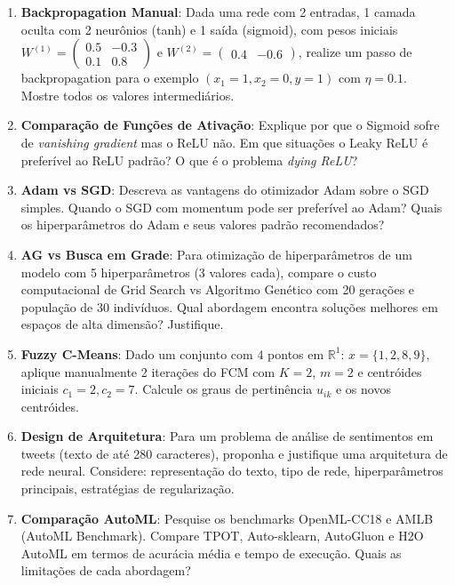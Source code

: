 \documentclass[12pt,a4paper]{article}
\begin{document}
\begin{enumerate}
  \item \textbf{Backpropagation Manual}: Dada uma rede com 2 entradas, 1 camada oculta com 2 neurônios (tanh) e 1 saída (sigmoid), com pesos iniciais $W^{(1)} = \begin{pmatrix}0.5 & -0.3\\ 0.1 & 0.8\end{pmatrix}$ e $W^{(2)} = \begin{pmatrix}0.4 & -0.6\end{pmatrix}$, realize um passo de backpropagation para o exemplo $(x_1=1, x_2=0, y=1)$ com $\eta=0.1$. Mostre todos os valores intermediários.

  \item \textbf{Comparação de Funções de Ativação}: Explique por que o Sigmoid sofre de \textit{vanishing gradient} mas o ReLU não. Em que situações o Leaky ReLU é preferível ao ReLU padrão? O que é o problema \textit{dying ReLU}?

  \item \textbf{Adam vs SGD}: Descreva as vantagens do otimizador Adam sobre o SGD simples. Quando o SGD com momentum pode ser preferível ao Adam? Quais os hiperparâmetros do Adam e seus valores padrão recomendados?

  \item \textbf{AG vs Busca em Grade}: Para otimização de hiperparâmetros de um modelo com 5 hiperparâmetros (3 valores cada), compare o custo computacional de Grid Search vs Algoritmo Genético com 20 gerações e população de 30 indivíduos. Qual abordagem encontra soluções melhores em espaços de alta dimensão? Justifique.

  \item \textbf{Fuzzy C-Means}: Dado um conjunto com 4 pontos em $\mathbb{R}^1$: $x = \{1, 2, 8, 9\}$, aplique manualmente 2 iterações do FCM com $K=2$, $m=2$ e centróides iniciais $c_1=2, c_2=7$. Calcule os graus de pertinência $u_{ik}$ e os novos centróides.

  \item \textbf{Design de Arquitetura}: Para um problema de análise de sentimentos em tweets (texto de até 280 caracteres), proponha e justifique uma arquitetura de rede neural. Considere: representação do texto, tipo de rede, hiperparâmetros principais, estratégias de regularização.

  \item \textbf{Comparação AutoML}: Pesquise os benchmarks OpenML-CC18 e AMLB (AutoML Benchmark). Compare TPOT, Auto-sklearn, AutoGluon e H2O AutoML em termos de acurácia média e tempo de execução. Quais as limitações de cada abordagem?
\end{enumerate}
\end{document}

